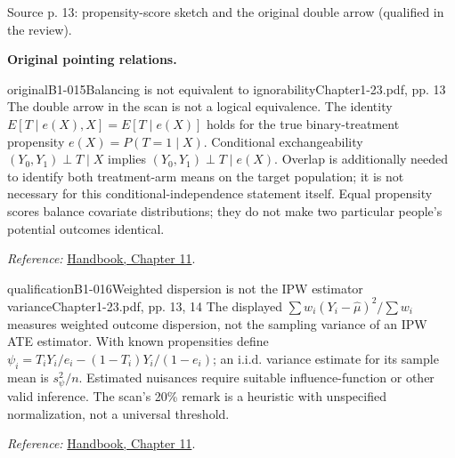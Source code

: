 {\begin{center}
\begin{tikzpicture}[>=Stealth, font=\small, line width=.65pt]
\end{tikzpicture}
\par{\small Source p. 13: propensity-score sketch and the original double arrow (qualified in the review).}
\end{center}
\par{}\smallskip\textbf{Original pointing relations.}\par\smallskip
{}
\begin{reviewnote}{original}{B1-015}{Balancing is not equivalent to ignorability}{Chapter1-23.pdf, pp. 13}
The double arrow in the scan is not a logical equivalence. The identity $E[T\mid e(X),X]=E[T\mid e(X)]$ holds for the true binary-treatment propensity $e(X)=P(T=1\mid X)$. Conditional exchangeability $(Y_0,Y_1)\perp T\mid X$ implies $(Y_0,Y_1)\perp T\mid e(X)$. Overlap is additionally needed to identify both treatment-arm means on the target population; it is not necessary for this conditional-independence statement itself. Equal propensity scores balance covariate distributions; they do not make two particular people's potential outcomes identical.
\par\smallskip\textit{Reference:} \href{https://matheusfacure.github.io/python-causality-handbook/11-Propensity-Score.html}{Handbook, Chapter 11}.
\end{reviewnote}

\begin{reviewnote}{qualification}{B1-016}{Weighted dispersion is not the IPW estimator variance}{Chapter1-23.pdf, pp. 13, 14}
The displayed $\sum w_i(Y_i-\hat\mu)^2/\sum w_i$ measures weighted outcome dispersion, not the sampling variance of an IPW ATE estimator. With known propensities define $\psi_i=T_iY_i/e_i-(1-T_i)Y_i/(1-e_i)$; an i.i.d. variance estimate for its sample mean is $s_\psi^2/n$. Estimated nuisances require suitable influence-function or other valid inference. The scan's 20\% remark is a heuristic with unspecified normalization, not a universal threshold.
\par\smallskip\textit{Reference:} \href{https://matheusfacure.github.io/python-causality-handbook/11-Propensity-Score.html}{Handbook, Chapter 11}.
\end{reviewnote}
}

